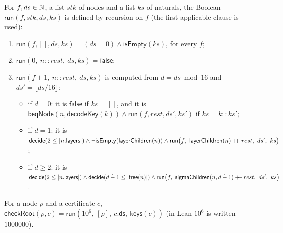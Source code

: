 \begin{definition}\label{cb:def:run}
For $f,ds\in\mathbb N$, a list $stk$ of nodes and a list $ks$ of naturals, the Boolean $\mathsf{run}(f,stk,ds,ks)$ is
defined by recursion on $f$ (the first applicable clause is used):
\begin{enumerate}[label=(R\arabic*)]
\item $\mathsf{run}(f,[],ds,ks)=(ds=0)\wedge\mathsf{isEmpty}(ks)$, for every $f$;
\item $\mathsf{run}(0,\ n\mathbin{::}rest,\ ds,ks)=\mathsf{false}$;
\item $\mathsf{run}(f+1,\ n\mathbin{::}rest,\ ds,ks)$ is computed from $d=ds\bmod16$ and $ds'=\lfloor ds/16\rfloor$:
  \begin{itemize}
  \item if $d=0$: it is $\mathsf{false}$ if $ks=[]$, and it is
    $\mathsf{beqNode}(n,\mathsf{decodeKey}(k))\wedge\mathsf{run}(f,rest,ds',ks')$ if $ks=k\mathbin{::}ks'$;
  \item if $d=1$: it is $\mathsf{decide}(2\le\card{n.\mathsf{layers}})\wedge
    \neg\mathsf{isEmpty}(\mathsf{layerChildren}(n))\wedge
    \mathsf{run}\big(f,\ \mathsf{layerChildren}(n)\mathbin{+\!\!+}rest,\ ds',\ ks\big)$;
  \item if $d\ge2$: it is $\mathsf{decide}(2\le\card{n.\mathsf{layers}})\wedge
    \mathsf{decide}(d\mathbin{\dot-}1\le\card{\mathsf{free}(n)})\wedge
    \mathsf{run}\big(f,\ \mathsf{sigmaChildren}(n,d\mathbin{\dot-}1)\mathbin{+\!\!+}rest,\ ds',\ ks\big)$.
  \end{itemize}
\end{enumerate}
\end{definition}

\begin{definition}\label{cb:def:checkroot}
For a node $\rho$ and a certificate $c$,
$\mathsf{checkRoot}(\rho,c)=\mathsf{run}(10^6,\ [\rho],\ c.\mathsf{ds},\ \mathsf{keys}(c))$ (in Lean $10^6$ is written
$1000000$).
\end{definition}

